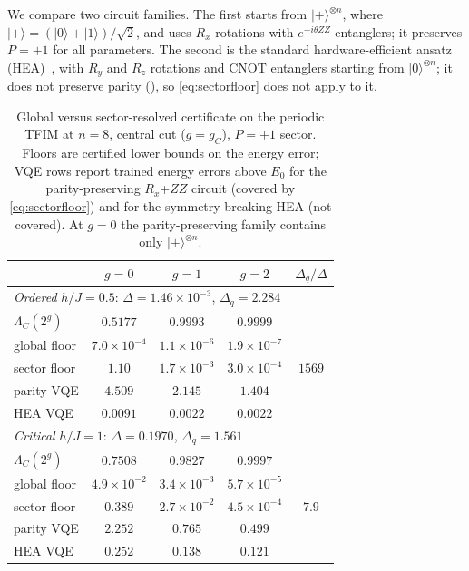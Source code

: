 \documentclass[reprint,aps,pra,floatfix,superscriptaddress,nofootinbib,longbibliography]{revtex4-2}
\theoremstyle{remark}
\theoremstyle{definition}
\newcommand{\ket}[1]{\lvert #1 \rangle}
\begin{document}
We compare two circuit families. The first starts from
$\ket{+}^{\otimes n}$, where $\ket{+}=(\ket0+\ket1)/\sqrt2$, and uses $R_x$
rotations with $e^{-i\theta ZZ}$ entanglers; it preserves $P=+1$ for all
parameters. The second is the standard hardware-efficient ansatz
(HEA)~\cite{kandala2017hardware}, with
$R_y$ and $R_z$ rotations and CNOT entanglers starting from $\ket{0}^{\otimes n}$;
it does not preserve parity (), so \eqref{eq:sectorfloor} does
not apply to it.

\begin{table}[t]
\centering
\caption{Global versus sector-resolved certificate on the periodic TFIM at
$n=8$, central cut ($g=g_C$), $P=+1$ sector. Floors are certified lower bounds on the
energy error; VQE rows report trained energy errors above $E_0$ for the
parity-preserving $R_x$+$ZZ$ circuit (covered by \eqref{eq:sectorfloor}) and for
the symmetry-breaking HEA (not covered). At $g=0$ the parity-preserving family
contains only $\ket{+}^{\otimes n}$.}
\label{tab:sector}
{\footnotesize\setlength{\tabcolsep}{2.6pt}
\begin{tabular}{lcccc}
\toprule
 & $g=0$ & $g=1$ & $g=2$ & $\Delta_q/\Delta$\\
\midrule
\multicolumn{5}{l}{\emph{Ordered} $h/J=0.5$: $\Delta=1.46{\times}10^{-3}$,
 $\Delta_q=2.284$}\\
$\Lambda_C(2^g)$    & $0.5177$ & $0.9993$ & $0.9999$ & \\
global floor       & $7.0{\times}10^{-4}$ & $1.1{\times}10^{-6}$ & $1.9{\times}10^{-7}$ & \\
sector floor       & $\mathbf{1.10}$ & $1.7{\times}10^{-3}$ & $3.0{\times}10^{-4}$ & $1569$\\
parity VQE         & $4.509$ & $2.145$ & $1.404$ & \\
HEA VQE            & $0.0091$ & $0.0022$ & $0.0022$ & \\[3pt]
\multicolumn{5}{l}{\emph{Critical} $h/J=1$: $\Delta=0.1970$, $\Delta_q=1.561$}\\
$\Lambda_C(2^g)$    & $0.7508$ & $0.9827$ & $0.9997$ & \\
global floor       & $4.9{\times}10^{-2}$ & $3.4{\times}10^{-3}$ & $5.7{\times}10^{-5}$ & \\
sector floor       & $0.389$ & $2.7{\times}10^{-2}$ & $4.5{\times}10^{-4}$ & $7.9$\\
parity VQE         & $2.252$ & $0.765$ & $0.499$ & \\
HEA VQE            & $0.252$ & $0.138$ & $0.121$ & \\[3pt]

\end{tabular}}
\end{table}
\end{document}
